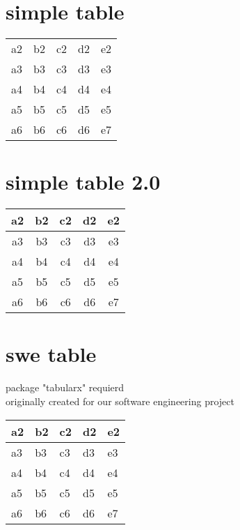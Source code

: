\documentclass[10pt]{article}
\begin{document}
\section{simple table}
\begin{center}
    \begin{tabular}{ | c| c| c| c| c | }
     \hline
    a2 & b2 & c2 & d2 & e2 \\ 
    a3 & b3 & c3 & d3 & e3 \\ 
    a4 & b4 & c4 & d4 & e4 \\ 
    a5 & b5 & c5 & d5 & e5 \\ 
    a6 & b6 & c6 & d6 & e7 \\ 
    \hline
    \end{tabular}
\end{center}

\section{simple table 2.0}
\begin{center}
    \begin{tabular}{ | c| c| c| c| c| }
     \hline
    a2 & b2 & c2 & d2 & e2 \\ 
     \hline 
    a3 & b3 & c3 & d3 & e3 \\ 
     \hline 
    a4 & b4 & c4 & d4 & e4 \\ 
     \hline 
    a5 & b5 & c5 & d5 & e5 \\ 
     \hline 
    a6 & b6 & c6 & d6 & e7 \\ 
     \hline 
    \end{tabular}
\end{center}

\section{swe table}

package "tabularx" requierd \\
originally created for our software engineering project
\begin{table}[h]
    \centering
    \tiny
    \begin{tabularx}{\textwidth}{|l|l|X|l|l|} 
    \hline 
    a2 & b2 & c2 & d2 & e2 \\ 
    \hline
    a3 & b3 & c3 & d3 & e3 \\ 
    \hline
    a4 & b4 & c4 & d4 & e4 \\ 
    \hline
    a5 & b5 & c5 & d5 & e5 \\ 
    \hline
    a6 & b6 & c6 & d6 & e7 \\ 
    \hline
    \end{tabularx}
\end{table}
\end{document}
